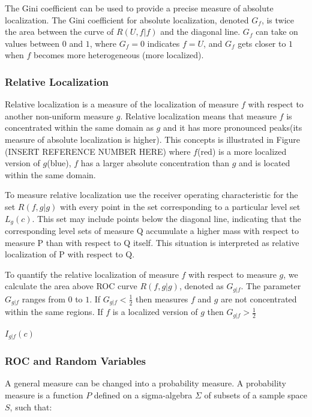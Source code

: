 \documentclass[12pt]{article} %
\theoremstyle{plain}
\begin{document}
 The Gini coefficient can be used to provide a precise measure of absolute localization. The Gini coefficient for absolute localization, denoted $G_f$, is twice the area between the curve of $R(U,f|f)$ and the diagonal line. $G_f$ can take on values between $0$ and $1$, where $G_f = 0$ indicates $f = U$, and $G_f$ gets closer to $1$ when $f$ becomes more heterogeneous (more localized). 
 
\subsubsection{Relative Localization} %
 
 Relative localization is a measure of the localization of measure $f$ with respect to another non-uniform measure $g$. Relative localization means that measure $f$ is concentrated within the same domain as $g$ and it has more pronounced peaks(its measure of absolute localization is higher). This concepts is illustrated in Figure (INSERT REFERENCE NUMBER HERE) where $f$(red) is a more localized version of $g$(blue), $f$ has a larger absolute concentration than $g$ and is located within the same domain.
 
 To measure relative localization use the receiver operating characteristic for the set $R(f,g|g)$ with every point in the set corresponding to a particular level set $L_g(c)$. This set may include points below the diagonal line, indicating that the corresponding level sets of measure Q accumulate a higher mass with respect to measure P than with respect to Q itself. This situation is interpreted as relative localization of P with respect to Q. 
 
 To quantify the relative localization of measure $f$ with respect to measure $g$, we calculate the area above ROC curve $R(f,g|g)$, denoted as $G_{g|f}$. The parameter $G_{g|f}$ ranges from $0$ to $1$. If $G_{g|f} < \frac{1}{2}$ then measures $f$ and $g$ are not concentrated within the same regions. If $f$ is a localized version of $g$ then $G_{g|f} > \frac{1}{2}$ 
 

$I_{g|f}(c)$

\subsubsection{ROC and Random Variables}

A general measure can be changed into a probability measure. A probability measure is a function $P$ defined on a sigma-algebra $\Sigma$ of subsets of a sample space $S$, such that:
\end{document}
